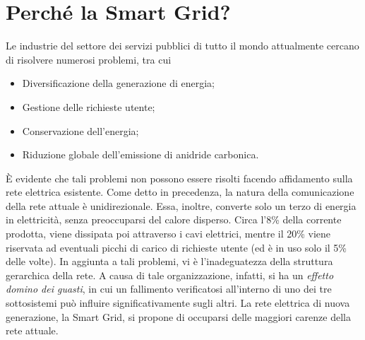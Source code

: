 \section{Perché la Smart Grid?}
Le industrie del settore dei servizi pubblici di tutto il mondo attualmente cercano di risolvere numerosi problemi, tra cui 
\begin{itemize}
\item Diversificazione della generazione di energia;
\item Gestione delle richieste utente;
\item Conservazione dell'energia;
\item Riduzione globale dell'emissione di anidride carbonica.
\end{itemize}
È evidente che tali problemi non possono essere risolti facendo affidamento sulla rete elettrica esistente. \newline
Come detto in precedenza, la natura della comunicazione della rete attuale è unidirezionale. Essa, inoltre, converte solo un terzo di energia in elettricità, senza preoccuparsi del calore disperso. Circa l'8\% della corrente prodotta, viene dissipata poi attraverso i cavi elettrici, mentre il 20\% viene riservata ad eventuali picchi di carico di richieste utente (ed è in uso solo il 5\% delle volte). \newline
In aggiunta a tali problemi, vi è l'inadeguatezza della struttura gerarchica della rete. A causa di tale organizzazione, infatti, si ha un \textit{effetto domino dei guasti}, in cui un fallimento verificatosi all'interno di uno dei tre sottosistemi può influire significativamente sugli altri. \newline
La rete elettrica di nuova generazione, la Smart Grid, si propone di occuparsi delle maggiori carenze della rete attuale.
\begin{figure}[h]
\end{figure}
